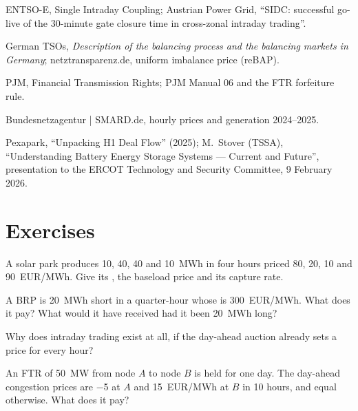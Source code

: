 \begin{omsources}
\item ENTSO-E, Single Intraday Coupling; Austrian Power Grid, ``SIDC: successful go-live of the
30-minute gate closure time in cross-zonal intraday trading''.
\item German TSOs, \emph{Description of the balancing process and the balancing markets in
Germany}; netztransparenz.de, uniform imbalance price (reBAP).
\item PJM, Financial Transmission Rights; PJM Manual 06 and the FTR forfeiture rule.
\item Bundesnetzagentur | SMARD.de, hourly prices and generation 2024--2025.
\item Pexapark, ``Unpacking H1 Deal Flow'' (2025); M.~Stover (TSSA), ``Understanding Battery Energy Storage Systems --- Current and Future'',
presentation to the ERCOT Technology and Security Committee, 9 February 2026.
\end{omsources}

\section{Exercises}

\begin{exercise}[$\star$]\label{exo:m3:power-markets-trading:1}
A solar park produces 10, 40, 40 and 10~MWh in four hours priced 80, 20, 10 and
\qty{90}{EUR/MWh}. Give its , the baseload price and its capture rate.
\end{exercise}

\begin{exercise}[$\star$]\label{exo:m3:power-markets-trading:2}
A BRP is 20~MWh short in a quarter-hour whose  is \qty{300}{EUR/MWh}. What does it
pay? What would it have received had it been 20~MWh long?
\end{exercise}

\begin{exercise}[$\star$]\label{exo:m3:power-markets-trading:3}
Why does intraday trading exist at all, if the day-ahead auction already sets a price for every
hour?
\end{exercise}

\begin{exercise}[$\star\star$]\label{exo:m3:power-markets-trading:4}
An FTR of 50~MW from node $A$ to node $B$ is held for one day. The day-ahead congestion prices are
\qty{-5}{} at $A$ and \qty{+15}{EUR/MWh} at $B$ in 10 hours, and equal otherwise. What does it
pay?
\end{exercise}

